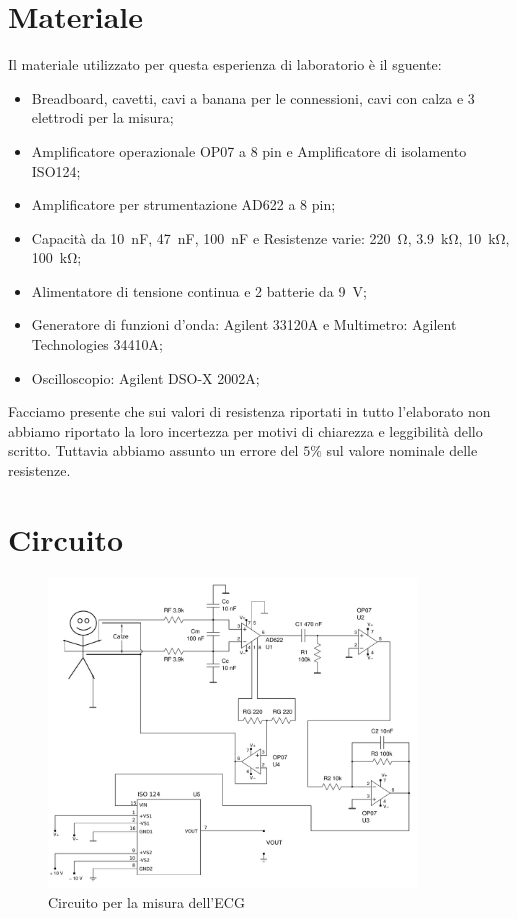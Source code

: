 \section*{Materiale}

Il materiale utilizzato per questa esperienza di laboratorio è il sguente:

\begin{itemize} \itemsep0pt \parskip0pt 
    \item{Breadboard, cavetti, cavi a banana per le connessioni, cavi con calza e 3 elettrodi per la misura;}
    \item{Amplificatore operazionale OP07 a 8 pin e Amplificatore di isolamento ISO124;}
    \item{Amplificatore per strumentazione AD622 a 8 pin;}
    \item{Capacità da \SI{10}{\nano\farad}, \SI{47}{\nano\farad}, \SI{100}{\nano\farad} e Resistenze varie: \SI{220}{\ohm}, \SI{3.9}{\kilo\ohm}, \SI{10}{\kilo\ohm}, \SI{100}{\kilo\ohm};}
    \item{Alimentatore di tensione continua e 2 batterie da \SI{9}{\volt};}
    \item{Generatore di funzioni d'onda: Agilent 33120A e Multimetro: Agilent Technologies 34410A;}
    \item{Oscilloscopio: Agilent DSO-X 2002A;}
\end{itemize}

Facciamo presente che sui valori di resistenza riportati in tutto l'elaborato non abbiamo riportato la loro incertezza per motivi di chiarezza e leggibilità dello scritto. Tuttavia abbiamo assunto un errore del $5\%$ sul valore nominale delle resistenze.

\section*{Circuito}

\begin{figure}[H]
    \centering
	\includegraphics[width=0.87\textwidth]{figure/s.pdf}
	\caption{Circuito per la misura dell'ECG}
	\label{fig:ecg}
\end{figure}

